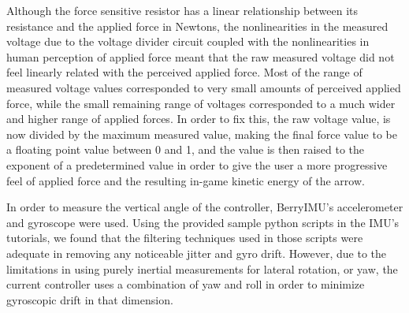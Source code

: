 \documentclass[titlepage, 12pt]{scrartcl}
\begin{document}
    Although the force sensitive resistor has a linear relationship between its resistance and the applied force in Newtons, the nonlinearities in the measured voltage due to the voltage divider circuit coupled with the nonlinearities in human perception of applied force meant that the raw measured voltage did not feel linearly related with the perceived applied force. Most of the range of measured voltage values corresponded to very small amounts of perceived applied force, while the small remaining range of voltages corresponded to a much wider and higher range of applied forces. In order to fix this, the raw voltage value, is now divided by the maximum measured value, making the final force value to be a floating point value between 0 and 1, and the value is then raised to the exponent of a predetermined value in order to give the user a more progressive feel of applied force and the resulting in-game kinetic energy of the arrow. \par
    In order to measure the vertical angle of the controller, BerryIMU's accelerometer and gyroscope were used. Using the provided sample python scripts in the IMU's tutorials, we found that the filtering techniques used in those scripts were adequate in removing any noticeable jitter and gyro drift. However, due to the limitations in using purely inertial measurements for lateral rotation, or yaw, the current controller uses a combination of yaw and roll in order to minimize gyroscopic drift in that dimension. \par
\end{document}
